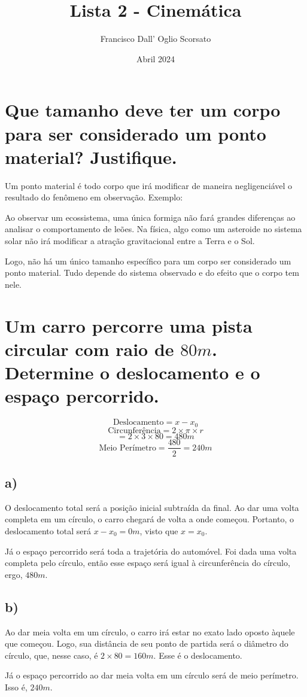 \documentclass[a4paper]{article}
\title{Lista 2 - Cinemática}
\author{Francisco Dall' Oglio Scorsato}
\date{Abril 2024}
\begin{document}
\setlength{\parindent}{20pt}
\maketitle



\section{Que tamanho deve ter um corpo para ser considerado um ponto material? Justifique.}
\hspace{\parindent}Um ponto material é todo corpo que irá modificar de maneira negligenciável o resultado do fenômeno em observação. Exemplo: \par
Ao observar um ecossistema, uma única formiga não fará grandes diferenças ao analisar o comportamento de leões. Na física, algo como um asteroide no sistema solar não irá modificar a atração gravitacional entre a Terra e o Sol.
\par Logo, não há um único tamanho específico para um corpo ser considerado um ponto material. Tudo depende do sistema observado e do efeito que o corpo tem nele.  

\section{Um carro percorre uma pista circular com raio de \(80m\). Determine o deslocamento e o espaço percorrido.}

\[\textrm{Deslocamento} = x - x_0\]
\[\textrm{Circunferência} = 2\times\pi\times r\]
\[= 2\times3\times80=480m\]
\[\textrm{Meio  Perímetro} =\frac{480}{2} = 240m\]

\subsection{a) }
\hspace{\parindent}O deslocamento total será a posição inicial subtraída da final. Ao dar uma volta completa em um círculo, o carro chegará de volta a onde começou. Portanto, o deslocamento total será \(x - x_0 = 0m\), visto que \(x=x_0\).
\par Já o espaço percorrido será toda a trajetória do automóvel. Foi dada uma volta completa pelo círculo, então esse espaço será igual à circunferência do círculo, ergo, \(480m\).

\subsection{b)} 
\hspace{\parindent}Ao dar meia volta em um círculo, o carro irá estar no exato lado oposto àquele que começou. Logo, sua distância de seu ponto de partida será o diâmetro do círculo, que, nesse caso, é \(2\times80=160m\). Esse é o deslocamento.
\par Já o espaço percorrido ao dar meia volta em um círculo será de meio perímetro. Isso é, \(240m\).
\end{document}

